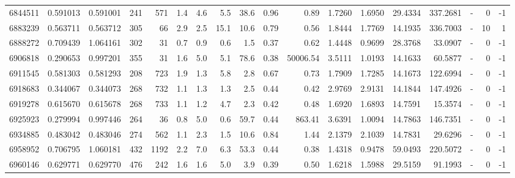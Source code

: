 \begin{tabular}{rrrrrrrrrrrrrrrlrr}
   6844511 & 0.591013 &   0.591001 &  241 &  571 &      1.4 &      4.6 &     5.5 &     38.6 &       0.96 &        0.89 &  1.7260 &  1.6950 &   29.4334 &  337.2681 &             - &        0 &         -1 \\
   6883239 & 0.563711 &   0.563712 &  305 &   66 &      2.9 &      2.5 &    15.1 &     10.6 &       0.79 &        0.56 &  1.8444 &  1.7769 &   14.1935 &  336.7003 &             - &       10 &          1 \\
   6888272 & 0.709439 &   1.064161 &  302 &   31 &      0.7 &      0.9 &     0.6 &      1.5 &       0.37 &        0.62 &  1.4448 &  0.9699 &   28.3768 &   33.0907 &             - &        0 &         -1 \\
   6906818 & 0.290653 &   0.997201 &  355 &   31 &      1.6 &      5.0 &     5.1 &     78.6 &       0.38 &    50006.54 &  3.5111 &  1.0193 &   14.1633 &   60.5877 &             - &        0 &         -1 \\
   6911545 & 0.581303 &   0.581293 &  208 &  723 &      1.9 &      1.3 &     5.8 &      2.8 &       0.67 &        0.73 &  1.7909 &  1.7285 &   14.1673 &  122.6994 &             - &        0 &         -1 \\
   6918683 & 0.344067 &   0.344073 &  268 &  732 &      1.1 &      1.3 &     1.3 &      2.5 &       0.44 &        0.42 &  2.9769 &  2.9131 &   14.1844 &  147.4926 &             - &        0 &         -1 \\
   6919278 & 0.615670 &   0.615678 &  268 &  733 &      1.1 &      1.2 &     4.7 &      2.3 &       0.42 &        0.48 &  1.6920 &  1.6893 &   14.7591 &   15.3574 &             - &        0 &         -1 \\
   6925923 & 0.279994 &   0.997446 &  264 &   36 &      0.8 &      5.0 &     0.6 &     59.7 &       0.44 &      863.41 &  3.6391 &  1.0094 &   14.7863 &  146.7351 &             - &        0 &         -1 \\
   6934885 & 0.483042 &   0.483046 &  274 &  562 &      1.1 &      2.3 &     1.5 &     10.6 &       0.84 &        1.44 &  2.1379 &  2.1039 &   14.7831 &   29.6296 &             - &        0 &         -1 \\
   6958952 & 0.706795 &   1.060181 &  432 & 1192 &      2.2 &      7.0 &     6.3 &     53.3 &       0.44 &        0.38 &  1.4318 &  0.9478 &   59.0493 &  220.5072 &             - &        0 &         -1 \\
   6960146 & 0.629771 &   0.629770 &  476 &  242 &      1.6 &      1.6 &     5.0 &      3.9 &       0.39 &        0.50 &  1.6218 &  1.5988 &   29.5159 &   91.1993 &             - &        0 &         -1 \\

\end{tabular}
